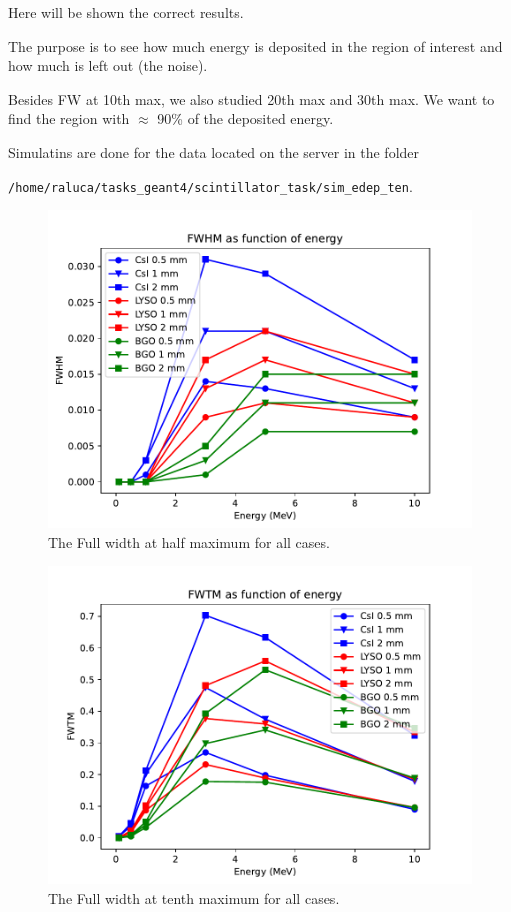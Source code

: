 \documentclass{article}
\begin{document}
Here will be shown the correct results. 

The purpose is to see how much energy is deposited in the region of interest and how much is left out (the noise). 

Besides FW at 10th max, we also studied 20th max and 30th max. We want to find the region with $\approx$ 90\% of the deposited energy. 

Simulatins are done for the data located on the server in the folder

 \verb|/home/raluca/tasks_geant4/scintillator_task/sim_edep_ten|.

 \begin{figure}[H]
    \centering
    \includegraphics[width=0.8\linewidth]{images/task6/FWHM_all.pdf}
    \caption{The Full width at half maximum for all cases. }
\end{figure}

 \begin{figure}[H]
    \centering
    \includegraphics[width=0.8\linewidth]{images/task6/FWTM_all.pdf}
    \caption{The Full width at tenth maximum for all cases. }
\end{figure}
\end{document}
